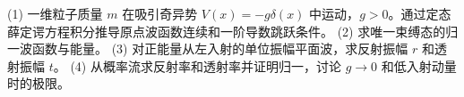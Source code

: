 (1) 一维粒子质量 \(m\) 在吸引奇异势 \(V(x)=-g\delta(x)\) 中运动，\(g>0\)。通过定态薛定谔方程积分推导原点波函数连续和一阶导数跳跃条件。
(2) 求唯一束缚态的归一波函数与能量。
(3) 对正能量从左入射的单位振幅平面波，求反射振幅 \(r\) 和透射振幅 \(t\)。
(4) 从概率流求反射率和透射率并证明归一，讨论 \(g\to0\) 和低入射动量时的极限。
